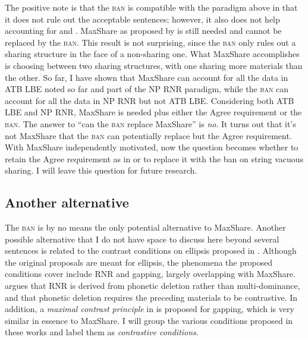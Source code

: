 \documentclass[output=paper]{langscibook}
\begin{document}
\ea{}
	\label{shenex34}
	\z 
\z 
The positive note is that the \textsc{ban} is compatible with the paradigm above in that it does not rule out the acceptable sentences; however, it also does not help accounting for  and . MaxShare as proposed by \citet{Citko:2006} is still needed and cannot be replaced by the \textsc{ban}. This result is not surprising, since the \textsc{ban} only rules out a sharing structure in the face of a non-sharing one. What MaxShare accomplishes is choosing between two sharing structures, with one sharing more materials than the other. So far, I have shown that MaxShare can account for all the data in ATB LBE noted so far and part of the NP RNR paradigm, while the \textsc{ban} can account for all the data in NP RNR but not ATB LBE. Considering both ATB LBE and NP RNR, MaxShare is needed plus either the Agree requirement or the \textsc{ban}. The answer to ``can the \textsc{ban} replace MaxShare'' is \emph{no}. It turns out that it's not MaxShare that the \textsc{ban} can potentially replace but the Agree requirement. With MaxShare independently motivated, now the question becomes whether to retain the Agree requirement as in \citet{Shen:2018a} or to replace it with the ban on string vacuous sharing. I will leave this question for future research.

\subsection{Another alternative} 

The \textsc{ban} is by no means the only potential alternative to MaxShare. Another possible alternative that I do not have space to discuss here beyond several sentences is related to the contrast conditions on ellipsis proposed in \citet{Hartmann:2000, Hartmann:2003, Fery:2005a}. Although the original proposals are meant for ellipsis, the phenomena the proposed conditions cover include RNR and gapping, largely overlapping with MaxShare. \citet{Hartmann:2000, Hartmann:2003} argues that RNR is derived from phonetic deletion rather than multi-dominance, and that phonetic deletion requires the preceding materials to be contrastive. In addition, a \textit{maximal contrast principle} in  is proposed for gapping, which is very similar in essence to MaxShare. I will group the various conditions proposed in these works and label them as \textit{contrastive conditions}.
\end{document}
